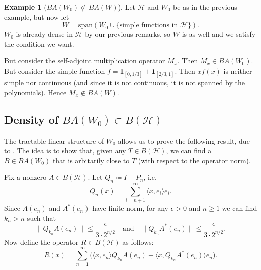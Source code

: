 \documentclass{dcthesis}
\numberwithin{equation}{section}
\numberwithin{equation}{section}
\theoremstyle{definition}
\newtheorem{example}[equation]{Example}
\newtheorem{remark}[equation]{Remark}
\begin{document}
\begin{example}[$BA(W_0)\not\subset BA(W)$]
	Let $\mathcal{H}$ and $W_0$ be as in the previous example, but now let 
	\begin{equation*}
		W=\text{span}(W_0\cup\{\text{simple functions in } \mathcal{H}\}).
	\end{equation*} 
	$W_0$ is already dense in $\mathcal{H}$ by our previous remarks, so $W$ is as well and we satisfy the condition we want.

	But consider the self-adjoint multiplication operator $M_x$. Then $M_x\in BA(W_0)$. But consider the simple function $f=\mathbf{1}_{[0,1/3]}+\mathbf{1}_{[2/3, 1]}$. Then $xf(x)$ is neither simple nor continuous (and since it is not continuous, it is not spanned by the polynomials). Hence $M_x\not\in BA(W)$.
\end{example}

% 


\subsection{Density of $BA(W_0) \subset B(\mathcal{H})$} %

The tractable linear structure of $W_0$ allows us to prove the following result, due to \cite{szwarc_2022}. The idea is to show that, given any $T\in B(\mathcal{H})$, we can find a $B\in BA(W_0)$ that is arbitarily close to $T$ (with respect to the operator norm).

Fix a nonzero $A\in B(\mathcal{H})$. Let $Q_n\coloneqq I - P_n$, i.e. 
	\begin{equation*}
		Q_n(x) = \sum_{i=n+1}^\infty \langle x, e_i \rangle e_i.
	\end{equation*}
	Since $A(e_n)$ and $A^\ast(e_n)$ have finite norm, for any $\epsilon>0$ and $n\geq 1$ we can find $k_n > n$ such that 
	\begin{equation*}
		\|Q_{k_n}A(e_n)\| \leq \frac{\epsilon}{3\cdot 2^{n/2}} \quad \text{and} \quad \|Q_{k_n}A^\ast(e_n)\| \leq \frac{\epsilon}{3\cdot 2^{n/2}}.
	\end{equation*}
	Now define the operator $R\in B(\mathcal{H})$ as follows:
	\begin{equation*}
		R(x) = \sum_{n=1}^\infty \Big( \langle x, e_n \rangle Q_{k_n}A(e_n) + \langle x, Q_{k_n}A^\ast(e_n) \rangle e_n \Big).
	\end{equation*}
\end{document}
